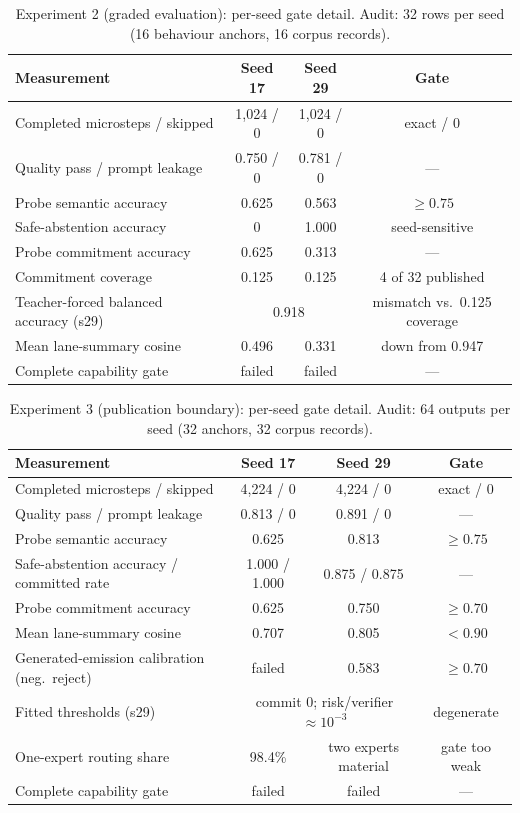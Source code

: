 \documentclass[10pt,a4paper]{article}
\newcommand{\fail}[1]{\textcolor{failred}{#1}}
\begin{document}
\begin{table}[htbp]
\caption{Experiment 2 (graded evaluation): per-seed gate detail. Audit: 32 rows per seed (16 behaviour anchors, 16 corpus records).}
\label{tab:gates-exp2}
\centering\footnotesize
\begin{tabularx}{\textwidth}{@{}Xccc@{}}
\toprule
Measurement & Seed 17 & Seed 29 & Gate \\
\midrule
Completed microsteps / skipped & 1,024 / 0 & 1,024 / 0 & exact / 0 \\
Quality pass / prompt leakage & 0.750 / 0 & 0.781 / 0 & --- \\
Probe semantic accuracy & \fail{0.625} & \fail{0.563} & $\geq 0.75$ \\
Safe-abstention accuracy & 0 & 1.000 & seed-sensitive \\
Probe commitment accuracy & 0.625 & 0.313 & --- \\
Commitment coverage & 0.125 & 0.125 & 4 of 32 published \\
Teacher-forced balanced accuracy (s29) & \multicolumn{2}{c}{0.918} & mismatch vs.\ 0.125 coverage \\
Mean lane-summary cosine & 0.496 & 0.331 & down from 0.947 \\
Complete capability gate & \fail{failed} & \fail{failed} & --- \\
\bottomrule
\end{tabularx}
\end{table}

\begin{table}[htbp]
\caption{Experiment 3 (publication boundary): per-seed gate detail. Audit: 64 outputs per seed (32 anchors, 32 corpus records).}
\label{tab:gates-exp3}
\centering\footnotesize
\begin{tabularx}{\textwidth}{@{}Xccc@{}}
\toprule
Measurement & Seed 17 & Seed 29 & Gate \\
\midrule
Completed microsteps / skipped & 4,224 / 0 & 4,224 / 0 & exact / 0 \\
Quality pass / prompt leakage & 0.813 / 0 & 0.891 / 0 & --- \\
Probe semantic accuracy & \fail{0.625} & 0.813 & $\geq 0.75$ \\
Safe-abstention accuracy / committed rate & 1.000 / 1.000 & 0.875 / 0.875 & --- \\
Probe commitment accuracy & \fail{0.625} & 0.750 & $\geq 0.70$ \\
Mean lane-summary cosine & 0.707 & 0.805 & $< 0.90$ \\
Generated-emission calibration (neg.\ reject) & \fail{failed} & \fail{0.583} & $\geq 0.70$ \\
Fitted thresholds (s29) & \multicolumn{2}{c}{commit 0; risk/verifier $\approx 10^{-3}$} & degenerate \\
One-expert routing share & 98.4\% & two experts material & gate too weak \\
Complete capability gate & \fail{failed} & \fail{failed} & --- \\
\bottomrule
\end{tabularx}
\end{table}
\end{document}
